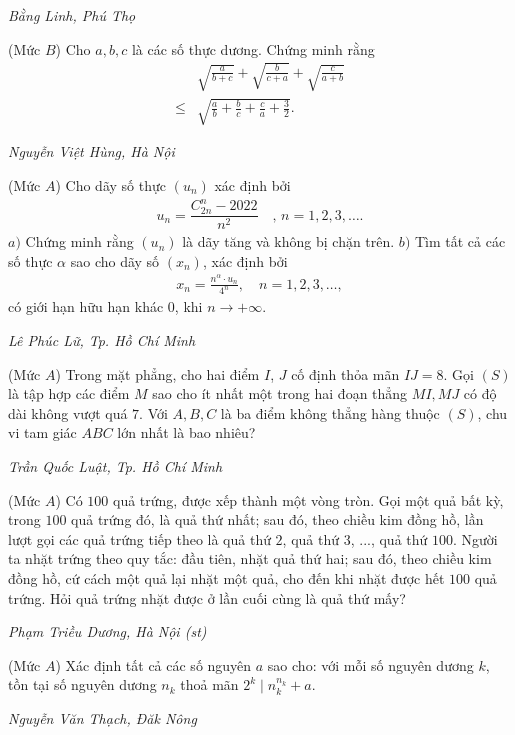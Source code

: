 \begin{multicols}{2}
\begin{figure}[H]
	\end{figure}
	\begin{flushright}
		\textit{Bằng Linh, Phú Thọ}
	\end{flushright}
	{}
	(Mức $B$) Cho $a, b, c$ là các số thực dương. Chứng minh rằng
	\begin{align*}
		&\sqrt{\frac{a}{b+c}}+\sqrt{\frac{b}{c+a}}+\sqrt{\frac{c}{a+b}}\\
		\leq &\sqrt{\frac{a}{b}+\frac{b}{c}+\frac{c}{a}+\frac{3}{2}} .
	\end{align*}
	\begin{flushright}
		\textit{Nguyễn Việt Hùng, Hà Nội}
	\end{flushright}
	{}
	(Mức $A$) Cho dãy số thực $(u_n)$ xác định bởi 
	\begin{align*}
		u_n=\dfrac{C^n_{2n}-2022}{n^2}\quad\text{, $n=1,2,3,\ldots$}.
	\end{align*}
	$a)$ Chứng minh rằng $(u_n)$ là dãy tăng và không bị chặn trên.
	\vskip 0.05cm
	$b)$ Tìm tất cả các số thực $\alpha$ sao cho dãy số $(x_n)$, xác định bởi
	\begin{align*}
		x_n = \frac{n^\alpha \cdot u_n}{4^n}, \quad n = 1,2,3,\ldots,
	\end{align*}
	có giới hạn hữu hạn khác $0$, khi $n \to + \infty$.
	\begin{flushright}
		\textit{Lê Phúc Lữ, Tp. Hồ Chí Minh}
	\end{flushright}
	{}
	(Mức $A$) Trong mặt phẳng, cho hai điểm $I$, $J$ cố định thỏa mãn $IJ=8$.  Gọi $(S)$ là tập hợp các điểm $M$ sao cho ít nhất một trong hai đoạn thẳng $MI,MJ$ có độ dài không vượt quá $7$. Với $A,B,C$ là ba điểm không thẳng hàng thuộc $(S)$, chu vi tam giác $ABC$ lớn nhất là bao nhiêu?
	\begin{flushright}
		\textit{Trần Quốc Luật, Tp. Hồ Chí Minh}
	\end{flushright}
	{}
	(Mức $A$) Có $100$ quả trứng, được xếp thành một vòng tròn. Gọi một quả bất kỳ, trong $100$ quả
	trứng đó, là quả thứ nhất; sau đó, theo chiều kim đồng hồ, lần lượt gọi các quả trứng tiếp theo là quả
	thứ $2$, quả thứ $3$, ..., quả thứ $100$. Người ta nhặt trứng theo quy tắc: đầu tiên, nhặt quả thứ hai; sau đó,
	theo chiều kim đồng hồ, cứ cách một quả lại nhặt một quả, cho đến khi nhặt được hết $100$ quả trứng.
	Hỏi quả trứng nhặt được ở lần cuối cùng là quả thứ mấy?
	\begin{flushright}
		\textit{Phạm Triều Dương, Hà Nội (st)}
	\end{flushright}
	{}
	(Mức $A$) Xác định tất cả các số nguyên $a$ sao cho: với mỗi số nguyên dương $k$, tồn tại số nguyên dương $n_k$ thoả mãn $2^k\mid n_k^{n_k}+a$. 
	\begin{flushright}
		\textit{Nguyễn Văn Thạch, Đăk Nông}
	\end{flushright}
\end{multicols}
